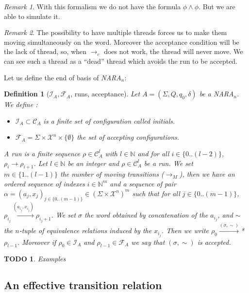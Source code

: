 \documentclass[a4paper,10pt]{report}
\newtheorem{df}{Definition}
\newtheorem{td}{TODO}
\theoremstyle{remark}
\newtheorem{rk}{Remark}
\newcommand{\seg}[1]{\{#1\}}
\newcommand{\C}{\mathcal{C}_{A}}
\newcommand{\I}{\mathcal{I}_{A}}
\newcommand{\F}{\mathcal{F}_{A}}
\newcommand{\X}{\mathcal{X}^{n}}
\begin{document}
\begin{rk}
  With this formalism we do not have the formula $ \phi \wedge \phi$. But we are able to simulate it.
\end{rk}


\begin{rk}
  \label{dead}
  The possibility to have multiple threads forces us to make them moving simultaneously on the word.
  Moreover the acceptance condition will be the lack of thread, so, when $\rightarrow_c$ does not work, the thread will never move.
  We can see such a thread as a ``dead'' thread which avoids the run to be accepted.
\end{rk}
Let us define the end of basis of \textit{NARA}$_n$:
\begin{df}[$\I,\F$, runs, acceptance]
Let $A = (\Sigma ,Q ,q_0, \delta )$ be a \textit{NARA}$_n$. We define :
\begin{itemize}
 \item $\I \subset \C$  is a finite set of configuration called initials.
 \item $\F = \Sigma \times \X \times \{\emptyset\}$ the set of accepting configurations.
\end{itemize}
A run is a finite sequence $\rho \in \C^l$ with $l \in \mathbb N$ and for all $i \in \seg{0..(l-2)}$, $\rho_i \rightarrow \rho_{i+1}$.
Let $l \in \mathbb N$ be an integer and $\rho \in \C^l$  be a run.
We set $m \in \seg{1..(l-1)}$ the number of moving transitions ($\rightarrow_M$), then we have an ordered sequence of indexes $i \in {\mathbb N}^m$ and a sequence of pair $\alpha = {(a_j,x_j)}_{j \in \seg{0..(m-1)}} \in {(\Sigma \times \X)}^m $
such that for all $j \in \seg{0..(m-1)}$, $\rho_{i_j} \xrightarrow{(a_{i_j},x_{i_j})} \rho_{i_j+1}$.
We set $\sigma$ the word obtained by concatenation of the $a_{i_j}$, and $\sim$ the $n$-tuple of equivalence relations induced by the $x_{i_j}$.
Then we write $\rho_0 \xrightarrow{(\sigma,\sim)}$*$ \rho_{l-1}$.
Moreover if $\rho_0 \in \I$ and $\rho_{l-1} \in \F$ we say that $(\sigma,\sim)$ is accepted.



\end{df}


\begin{td}
  Examples
\end{td}

\subsection{An effective transition relation}
\end{document}
